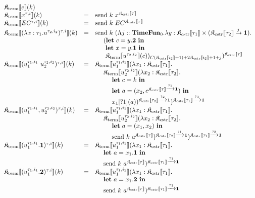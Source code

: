 \documentclass[fleqn]{article}
\begin{document}
\[
\begin{array}{lcl}
	\cpst{e}{k} \\
	\cpst{x^{\tau,i}}{k} & = & \mathrm{send}~k~x^{\cpsc{\tau}} \\
	\cpst{EC^{\tau,i}}{k} & = & \mathrm{send}~k~EC^{\cpsc{\tau}} \\
	\cpst{(\lambda x : \tau_1. u^{\tau_2,i_2})^{\tau,i}}{k} & = & \mathrm{send}~k~(\Lambda j :: \mathbf{TimeFun}_0. \lambda y : \cpsc{\tau_1} \times (\cpsc{\tau_2} \xrightarrow{j} \mathbf{1}). \\
	& & ~~~~ (\mathbf{let}~c=y.\mathbf{2}~\mathbf{in} \\
	& & ~~~~~ \mathbf{let}~x=y.\mathbf{1}~\mathbf{in} \\
	& & ~~~~~ \cpst{u^{\tau_2,i_2}}{c})_{C(\cpsc{i_2}+1)+2\cpsc{i_2}+1+j} )^{\cpsc{\tau}} \\
	\cpst{(u_1^{\tau_1,i_1}~u_2^{\tau_2,i_2})^{\tau,i}}{k} & = & \cpst{u_1^{\tau_1,i_1}}{\lambda x_1 : \cpsc{\tau_1}. \\
	& & ~~~~ \cpst{u_2^{\tau_2,i_2}}{\lambda x_2:\cpsc{\tau_2}. \\
	& & ~~~~~~~~ \mathbf{let}~c = k~\mathbf{in} \\
	& & ~~~~~~~~ \mathbf{let}~a = (x_2,c^{\cpsc{\tau} \xrightarrow{?1} \mathbf{1}})~\mathbf{in} \\
	& & ~~~~~~~~ x_1[?1](a) }^{\cpsc{\tau_2} \xrightarrow{?2} \mathbf{1}} }^{\cpsc{\tau_1} \xrightarrow{?3} \mathbf{1}} \\
	\cpst{(u_1^{\tau_1,i_1},u_2^{\tau_2,i_2})^{\tau,i}}{k} & = & \cpst{u_1^{\tau_1,i_1}}{\lambda x_1 : \cpsc{\tau_1}. \\
	& & ~~~~ \cpst{u_2^{\tau_2,i_2}}{\lambda x_2 : \cpsc{\tau_2}. \\
	& & ~~~~~~~~ \mathbf{let}~a=(x_1,x_2)~\mathbf{in} \\
	& & ~~~~~~~~ \mathrm{send}~k~a^{\cpsc{\tau}} }^{\cpsc{\tau_2} \xrightarrow{?1} \mathbf{1}} }^{\cpsc{\tau_1} \xrightarrow{?2} \mathbf{1}} \\
	\cpst{(u_1^{\tau_1,i_1}.\mathbf{1})^{\tau,i}}{k} & = & \cpst{u_1^{\tau_1,i_1}}{\lambda x_1 : \cpsc{\tau_1}. \\
	& & ~~~~ \mathbf{let}~a=x_1.\mathbf{1}~\mathbf{in} \\
	& & ~~~~ \mathrm{send}~k~a^{\cpsc{\tau}} }^{\cpsc{\tau_1} \xrightarrow{?1} \mathbf{1}} \\
	\cpst{(u_1^{\tau_1,i_1}.\mathbf{2})^{\tau.i}}{k} & = & \cpst{u_1^{\tau_1,i_1}}{\lambda x_1 : \cpsc{\tau_1}. \\
	& & ~~~~ \mathbf{let}~a=x_1.\mathbf{2}~\mathbf{in} \\
	& & ~~~~ \mathrm{send}~k~a^{\cpsc{\tau}} }^{\cpsc{\tau_1} \xrightarrow{?1} \mathbf{1}}
\end{array}
\]
\end{document}
